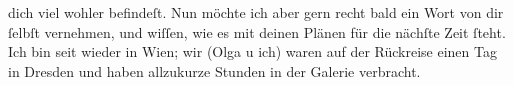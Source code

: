                dich viel wohler befindeſt. Nun möchte ich aber gern recht bald ein Wort von dir{ }ſelbſt vernehmen, und wiſſen, wie es mit deinen Plänen für die nächſte Zeit{ }ſteht.
               Ich bin seit \label{K_L01376-1v}\label{K_L01376-1} wieder in Wien; wir
               (Olga u ich) waren {\pb}auf der Rückreise einen
               Tag in Dresden und haben allzukurze Stunden in
               der Galerie verbracht.\pend
           
